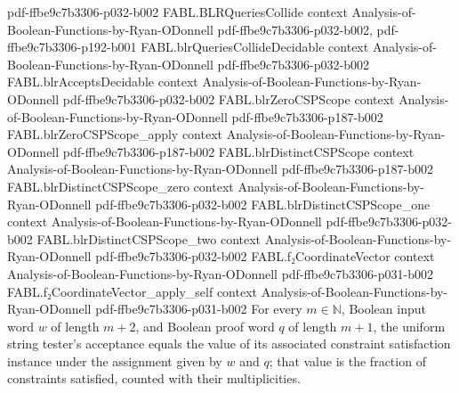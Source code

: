 \begin{theorem}
  {pdf-ffbe9c7b3306-p032-b002}
\proofstep
  {FABL.BLRQueriesCollide}
  {context}
  {Analysis-of-Boolean-Functions-by-Ryan-ODonnell}
  {pdf-ffbe9c7b3306-p032-b002,
    pdf-ffbe9c7b3306-p192-b001}
\proofstep
  {FABL.blrQueriesCollideDecidable}
  {context}
  {Analysis-of-Boolean-Functions-by-Ryan-ODonnell}
  {pdf-ffbe9c7b3306-p032-b002}
\proofstep
  {FABL.blrAcceptsDecidable}
  {context}
  {Analysis-of-Boolean-Functions-by-Ryan-ODonnell}
  {pdf-ffbe9c7b3306-p032-b002}
\proofstep
  {FABL.blrZeroCSPScope}
  {context}
  {Analysis-of-Boolean-Functions-by-Ryan-ODonnell}
  {pdf-ffbe9c7b3306-p187-b002}
\proofstep
  {FABL.blrZeroCSPScope_apply}
  {context}
  {Analysis-of-Boolean-Functions-by-Ryan-ODonnell}
  {pdf-ffbe9c7b3306-p187-b002}
\proofstep
  {FABL.blrDistinctCSPScope}
  {context}
  {Analysis-of-Boolean-Functions-by-Ryan-ODonnell}
  {pdf-ffbe9c7b3306-p187-b002}
\proofstep
  {FABL.blrDistinctCSPScope_zero}
  {context}
  {Analysis-of-Boolean-Functions-by-Ryan-ODonnell}
  {pdf-ffbe9c7b3306-p032-b002}
\proofstep
  {FABL.blrDistinctCSPScope_one}
  {context}
  {Analysis-of-Boolean-Functions-by-Ryan-ODonnell}
  {pdf-ffbe9c7b3306-p032-b002}
\proofstep
  {FABL.blrDistinctCSPScope_two}
  {context}
  {Analysis-of-Boolean-Functions-by-Ryan-ODonnell}
  {pdf-ffbe9c7b3306-p032-b002}
\proofstep
  {FABL.f₂CoordinateVector}
  {context}
  {Analysis-of-Boolean-Functions-by-Ryan-ODonnell}
  {pdf-ffbe9c7b3306-p031-b002}
\proofstep
  {FABL.f₂CoordinateVector_apply_self}
  {context}
  {Analysis-of-Boolean-Functions-by-Ryan-ODonnell}
  {pdf-ffbe9c7b3306-p031-b002}
For every $m\in\mathbb{N}$, Boolean input word $w$ of length $m+2$, and Boolean proof
word $q$ of length $m+1$, the uniform string tester's acceptance equals the value of its
associated constraint satisfaction instance under the assignment given by $w$ and $q$;
that value is the fraction of constraints satisfied, counted with their multiplicities.
\end{theorem}

